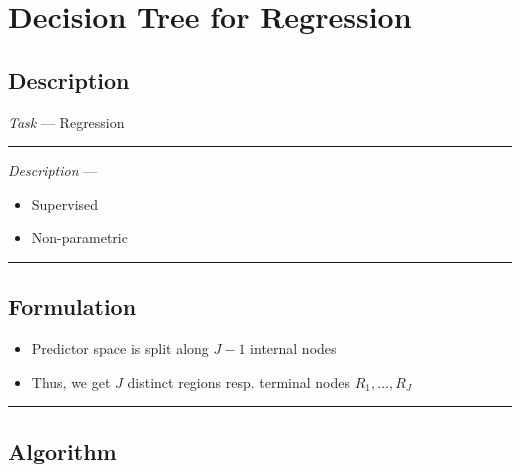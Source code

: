 \section{Decision Tree for Regression}
\subsection*{Description}
\emph{Task} --- Regression

{\color{lightgray}\hrule height 0.001mm}

\emph{Description} --- 
\begin{itemize}
    \item Supervised
    \item Non-parametric
\end{itemize}

{\color{black}\hrule height 0.001mm}

\subsection*{Formulation}
\begin{itemize}
    \item Predictor space is split along $J-1$ internal nodes
    \item Thus, we get $J$ distinct regions resp. terminal nodes $R_1, ..., R_J$
\end{itemize}

{\color{black}\hrule height 0.001mm}
    
\subsection*{Algorithm}

